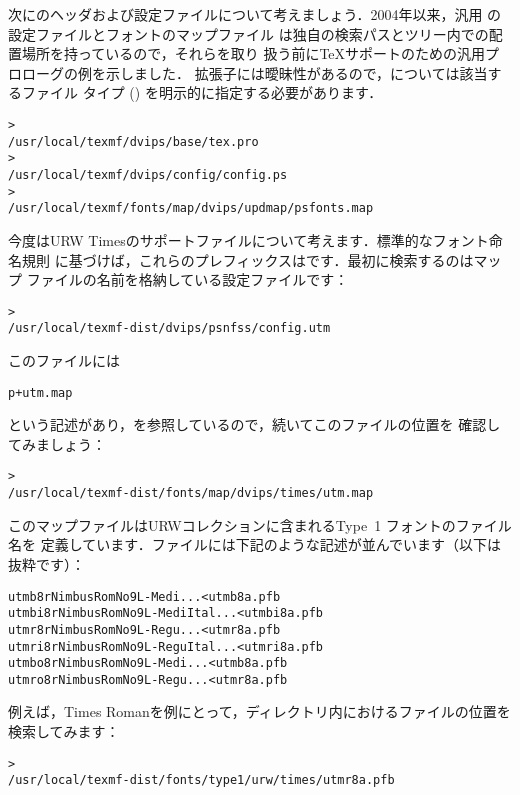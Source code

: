 \documentclass[uplatex,dvipdfmx]{jsarticle}
\begin{document}
次にのヘッダおよび設定ファイルについて考えましょう．2004年以来，汎用
の設定ファイルと\PS フォントのマップファイル%
は独自の検索パスとツリー内での配置場所を持っているので，それらを取り
扱う前に\TeX サポートのための汎用プロローグの例を示しました．
拡張子には曖昧性があるので，については該当するファイル
タイプ () を明示的に指定する必要があります．
%
\begin{alltt}
> 
   /usr/local/texmf/dvips/base/tex.pro
> 
   /usr/local/texmf/dvips/config/config.ps
> 
   /usr/local/texmf/fonts/map/dvips/updmap/psfonts.map
\end{alltt}

今度はURW Timesの\PS サポートファイルについて考えます．標準的なフォント命名規則
に基づけば，これらのプレフィックスはです．最初に検索するのはマップ
ファイルの名前を格納している設定ファイルです：
%
\begin{alltt}
> 
   /usr/local/texmf-dist/dvips/psnfss/config.utm
\end{alltt}
%
このファイルには
%
\begin{alltt}
  p +utm.map
\end{alltt}
%
という記述があり，を参照しているので，続いてこのファイルの位置を
確認してみましょう：
%
\begin{alltt}
> 
   /usr/local/texmf-dist/fonts/map/dvips/times/utm.map
\end{alltt}
%
このマップファイルはURWコレクションに含まれるType~1 \PS フォントのファイル名を
定義しています．ファイルには下記のような記述が並んでいます（以下は抜粋です）：
%
\begin{alltt}
utmb8r  NimbusRomNo9L-Medi    ... <utmb8a.pfb
utmbi8r NimbusRomNo9L-MediItal... <utmbi8a.pfb
utmr8r  NimbusRomNo9L-Regu    ... <utmr8a.pfb
utmri8r NimbusRomNo9L-ReguItal... <utmri8a.pfb
utmbo8r NimbusRomNo9L-Medi    ... <utmb8a.pfb
utmro8r NimbusRomNo9L-Regu    ... <utmr8a.pfb
\end{alltt}
%
例えば，Times Romanを例にとって，ディレクトリ内におけるファイルの位置を検索してみます：
%
\begin{alltt}
> 
   /usr/local/texmf-dist/fonts/type1/urw/times/utmr8a.pfb
\end{alltt}
\end{document}

